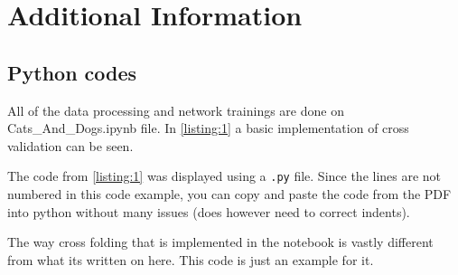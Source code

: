 \appendix


\section{Additional Information}
\subsection{Python codes}
All of the data processing and network trainings are done on Cats\_And\_Dogs.ipynb file. In \cref{listing:1} a basic implementation of cross validation can be seen. 




The code from \cref{listing:1} was displayed using a \verb+.py+ file. Since the lines are not numbered in this code example, you can copy and paste the code from the PDF into python without many issues (does however need to correct indents). \par
The way cross folding that is implemented in the notebook is vastly different from what its written on here. This code is just an example for it.\par

